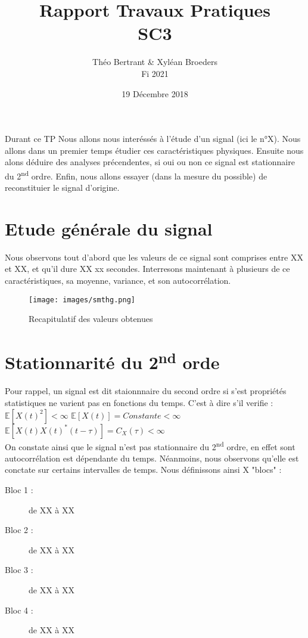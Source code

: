 \documentclass[french, a4paper, 12pt, openany]{book}
\title{Rapport Travaux Pratiques \\ SC3}
\author{Théo Bertrant \& Xyléan Broeders \\ Fi 2021}
\date{19 Décembre 2018}
\begin{document}
\maketitle
Durant ce TP Nous allons nous interéssés à l'étude d'un signal (ici le n°X). Nous allons dans un premier temps étudier ces caractéristiques physiques. Ensuite nous alons déduire des analyses précendentes, si oui ou non ce signal est stationnaire du 2\textsuperscript{nd} ordre. Enfin, nous allons essayer (dans la mesure du possible) de reconstituier le signal d'origine.
\section{Etude générale du signal}
  Nous observons tout d'abord que les valeurs de ce signal sont comprises entre XX et XX, et qu'il dure XX xx secondes.
  Interresons maintenant à plusieurs de ce caractéristiques, sa moyenne, variance, et son autocorrélation.
  \begin{figure}[ht]
    \begin{center}
      \texttt{[image: images/smthg.png]}
    \end{center}
    \caption{Recapitulatif des valeurs obtenues}
    \label{Recapitulatif des valeurs obtenues}
  \end{figure}

\section{Stationnarité du 2\textsuperscript{nd} orde}
  Pour rappel, un signal est dit staionnnaire du second ordre si s'est propriétés statistiques ne varient pas en fonctions du temps. C'est à dire s'il verifie :
  \begin{math}\mathbb{E}[X(t)^2]<\infty\end{math}
  \begin{math}\mathbb{E}[X(t)]=Constante<\infty\end{math}
  \begin{math}\mathbb{E}[X(t)X(t)^*(t-\tau)]=C_X(\tau)<\infty\end{math}
  \\
  On constate ainsi que le signal n'est pas stationnaire du 2\textsuperscript{nd} ordre, en effet sont autocorrélation est dépendante du temps. Néanmoins, nous observons qu'elle est conctate sur certains intervalles de temps. Nous définissons ainsi X "blocs" :
  \begin{description}
    \item[Bloc 1 : ]de XX à XX
    \item[Bloc 2 : ]de XX à XX
    \item[Bloc 3 : ]de XX à XX
    \item[Bloc 4 : ]de XX à XX
  \end{description}
\end{document}
